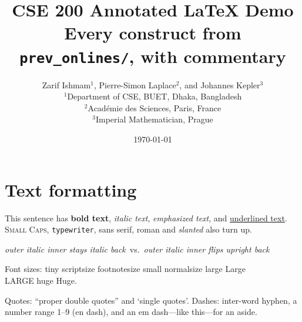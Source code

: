 \documentclass[11pt,a4paper]{article}
\title{CSE 200 Annotated LaTeX Demo \\[4pt]
       \large Every construct from \texttt{prev\_onlines/}, with commentary}
\author{
Zarif Ishmam$^{1}$, Pierre-Simon Laplace$^{2}$, and Johannes Kepler$^{3}$\\[6pt]
\small $^{1}$Department of CSE, BUET, Dhaka, Bangladesh\\
\small $^{2}$Acad\'emie des Sciences, Paris, France\\
\small $^{3}$Imperial Mathematician, Prague
}
\date{\today}
\theoremstyle{definition}                   %
\begin{document}

\maketitle

\tableofcontents
\newpage


\section{Text formatting}

This sentence has \textbf{bold text}, \textit{italic text},
\emph{emphasized text}, and \underline{underlined text}.
\textsc{Small Caps}, \texttt{typewriter}, \textsf{sans serif},
\textrm{roman} and \textsl{slanted} also turn up.

\textit{outer italic \textit{inner stays italic} back}\ vs.\
\textit{outer italic \emph{inner flips upright} back}

Font sizes: {\tiny tiny} {\scriptsize scriptsize} {\footnotesize footnotesize}
{\small small} {\normalsize normalsize} {\large large} {\Large Large}\\
{\LARGE LARGE} {\huge huge} {\Huge Huge}.

Quotes: ``proper double quotes'' and `single quotes'.
Dashes: inter-word hyphen, a number range 1--9 (en dash),
and an em dash---like this---for an aside.
\end{document}
